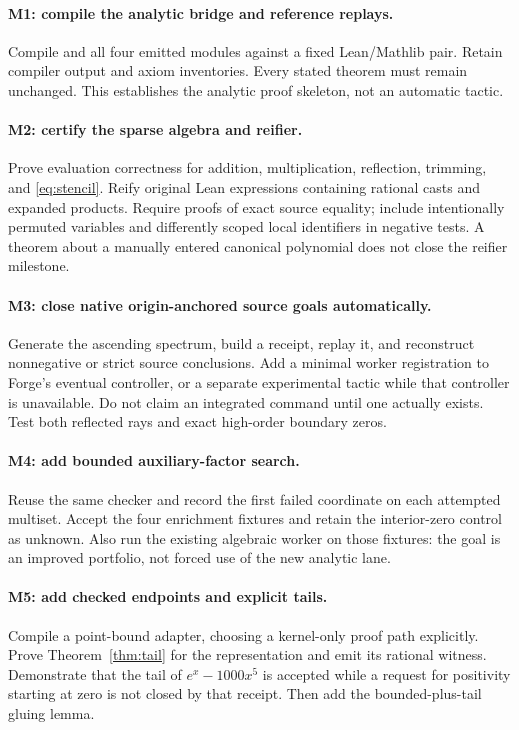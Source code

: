 \paragraph{M1: compile the analytic bridge and reference replays.}
Compile  and all four emitted modules against a fixed
Lean/Mathlib pair. Retain compiler output and axiom inventories. Every stated
theorem must remain unchanged. This establishes the analytic proof skeleton,
not an automatic tactic.

\paragraph{M2: certify the sparse algebra and reifier.}
Prove evaluation correctness for addition, multiplication, reflection, trimming,
and \eqref{eq:stencil}. Reify original Lean expressions containing rational
casts and expanded products. Require proofs of exact source equality; include
intentionally permuted variables and differently scoped local identifiers in
negative tests. A theorem about a manually entered canonical polynomial does
not close the reifier milestone.

\paragraph{M3: close native origin-anchored source goals automatically.}
Generate the ascending spectrum, build a receipt, replay it, and reconstruct
nonnegative or strict source conclusions. Add a minimal worker registration to
Forge's eventual controller, or a separate experimental tactic while that
controller is unavailable. Do not claim an integrated \forge{} command until
one actually exists. Test both reflected rays and exact high-order boundary
zeros.

\paragraph{M4: add bounded auxiliary-factor search.}
Reuse the same checker and record the first failed coordinate on each attempted
multiset. Accept the four enrichment fixtures and retain the interior-zero
control as unknown. Also run the existing algebraic worker on those fixtures:
the goal is an improved portfolio, not forced use of the new analytic lane.

\paragraph{M5: add checked endpoints and explicit tails.}
Compile a point-bound adapter, choosing a kernel-only proof path explicitly.
Prove Theorem~\ref{thm:tail} for the representation and emit its rational
witness. Demonstrate that the tail of $e^x-1000x^5$ is accepted while a request
for positivity starting at zero is not closed by that receipt. Then add the
bounded-plus-tail gluing lemma.

